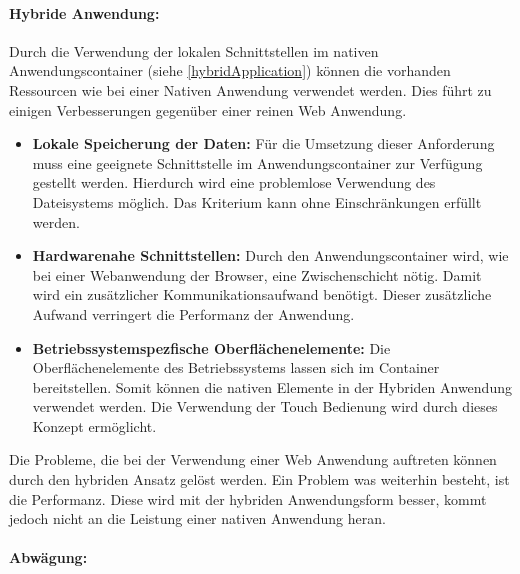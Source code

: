 \paragraph{Hybride Anwendung: }Durch die Verwendung der lokalen Schnittstellen im nativen Anwendungscontainer (siehe \ref{hybridApplication}) können die vorhanden Ressourcen wie bei einer Nativen Anwendung verwendet werden. Dies führt zu einigen Verbesserungen gegenüber einer reinen Web Anwendung.

\begin{itemize}
 \item \textbf{Lokale Speicherung der Daten:} Für die Umsetzung dieser Anforderung muss eine geeignete Schnittstelle im Anwendungscontainer zur Verfügung gestellt werden. Hierdurch wird eine problemlose Verwendung des Dateisystems möglich. Das Kriterium kann ohne Einschränkungen erfüllt werden. 
 
 \item \textbf{Hardwarenahe Schnittstellen:} Durch den Anwendungscontainer wird, wie bei einer Webanwendung der Browser, eine Zwischenschicht nötig. Damit wird ein zusätzlicher Kommunikationsaufwand benötigt. Dieser zusätzliche Aufwand verringert die Performanz der Anwendung.
 
 \item \textbf{Betriebssystemspezfische Oberflächenelemente:} Die Oberflächenelemente des Betriebssystems lassen sich im Container bereitstellen. Somit können die nativen Elemente in der Hybriden Anwendung verwendet werden. Die Verwendung der Touch Bedienung wird durch dieses Konzept ermöglicht.
 \end{itemize}
 Die Probleme, die bei der Verwendung einer Web Anwendung auftreten können durch den hybriden Ansatz gelöst werden. Ein Problem was weiterhin besteht, ist die Performanz. Diese wird mit der hybriden Anwendungsform besser, kommt jedoch nicht an die Leistung einer nativen Anwendung heran.

\paragraph{Abwägung: }


